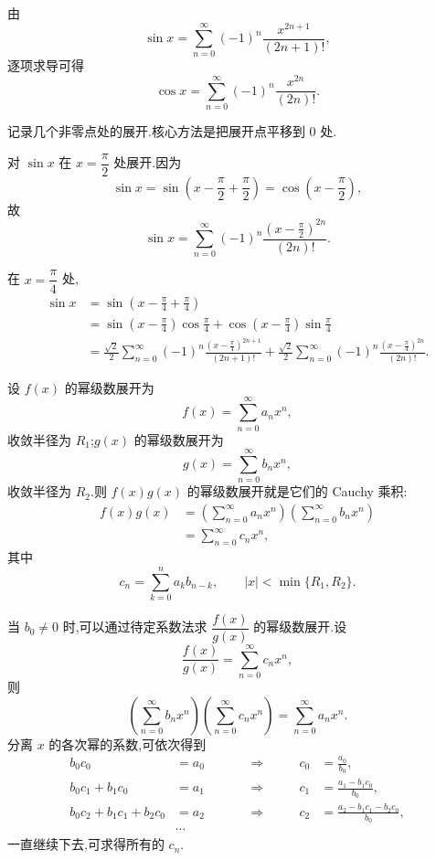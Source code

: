 \begin{example}
	由
	\[
	\sin x=\sum_{n=0}^{\infty}(-1)^n\frac{x^{2n+1}}{(2n+1)!},
	\]
	逐项求导可得
	\[
	\cos x=\sum_{n=0}^{\infty}(-1)^n\frac{x^{2n}}{(2n)!}.
	\]
\end{example}

记录几个非零点处的展开.核心方法是把展开点平移到 $0$ 处.

\begin{example}
	对 $\sin x$ 在 $x=\dfrac{\pi}{2}$ 处展开.因为
	\[
	\sin x=\sin\left(x-\frac{\pi}{2}+\frac{\pi}{2}\right)=\cos\left(x-\frac{\pi}{2}\right),
	\]
	故
	\[
	\sin x=\sum_{n=0}^{\infty}(-1)^n\frac{\left(x-\frac{\pi}{2}\right)^{2n}}{(2n)!}.
	\]
\end{example}

\begin{example}
	在 $x=\dfrac{\pi}{4}$ 处,
	\[
	\begin{aligned}
		\sin x
		&=\sin\left(x-\frac{\pi}{4}+\frac{\pi}{4}\right)                      \\
		&=\sin\left(x-\frac{\pi}{4}\right)\cos\frac{\pi}{4}
		+\cos\left(x-\frac{\pi}{4}\right)\sin\frac{\pi}{4}                     \\
		&=\frac{\sqrt{2}}{2}\sum_{n=0}^{\infty}(-1)^n\frac{\left(x-\frac{\pi}{4}\right)^{2n+1}}{(2n+1)!}
		+\frac{\sqrt{2}}{2}\sum_{n=0}^{\infty}(-1)^n\frac{\left(x-\frac{\pi}{4}\right)^{2n}}{(2n)!}.
	\end{aligned}
	\]
\end{example}
设 $f(x)$ 的幂级数展开为
\[
f(x)=\sum_{n=0}^{\infty}a_nx^n,
\]
收敛半径为 $R_1$;$g(x)$ 的幂级数展开为
\[
g(x)=\sum_{n=0}^{\infty}b_nx^n,
\]
收敛半径为 $R_2$.则 $f(x)g(x)$ 的幂级数展开就是它们的 Cauchy 乘积:
\[
\begin{aligned}
	f(x)g(x)
	&=\left(\sum_{n=0}^{\infty}a_nx^n\right)
	\left(\sum_{n=0}^{\infty}b_nx^n\right)        \\
	&=\sum_{n=0}^{\infty}c_nx^n,
\end{aligned}
\]
其中
\[
c_n=\sum_{k=0}^{n}a_kb_{n-k},
\qquad |x|<\min\{R_1,R_2\}.
\]

当 $b_0\neq0$ 时,可以通过待定系数法求 $\dfrac{f(x)}{g(x)}$ 的幂级数展开.设
\[
\frac{f(x)}{g(x)}=\sum_{n=0}^{\infty}c_nx^n,
\]
则
\[
\left(\sum_{n=0}^{\infty}b_nx^n\right)
\left(\sum_{n=0}^{\infty}c_nx^n\right)
=\sum_{n=0}^{\infty}a_nx^n.
\]
分离 $x$ 的各次幂的系数,可依次得到
\[
\begin{alignedat}{5}
	b_0c_0&=a_0
	&\qquad&\Longrightarrow
	&\qquad c_0&=\frac{a_0}{b_0},\\
	b_0c_1+b_1c_0&=a_1
	&\qquad&\Longrightarrow
	&\qquad c_1&=\frac{a_1-b_1c_0}{b_0},\\
	b_0c_2+b_1c_1+b_2c_0&=a_2
	&\qquad&\Longrightarrow
	&\qquad c_2&=\frac{a_2-b_1c_1-b_2c_0}{b_0},\\
	&\cdots
\end{alignedat}
\]
一直继续下去,可求得所有的 $c_n$.

